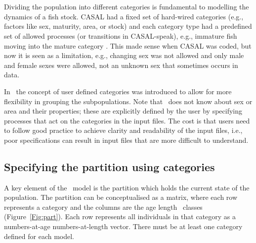 \section{\label{sec:PartitionCategories}}

Dividing the population into different categories is fundamental to modelling the dynamics of a fish stock. CASAL had a fixed set of hard-wired categories (e.g., factors like sex, maturity, area, or stock) and each category type had a predefined set of allowed processes (or transitions in CASAL-speak), e.g., immature fish moving into the mature category \citep{1388}. This made sense when CASAL was coded, but now it is seen as a limitation, e.g., changing sex was not allowed and only male and female sexes were allowed, not an unknown sex that sometimes occurs in data. 

In \CNAME\, the concept of user defined categories was introduced to allow for more flexibility in grouping the subpopulations. Note that \CNAME\ does not know about sex or area and their properties; these are explicitly defined by the user by specifying processes that act on the categories in the input files. The cost is that users need to follow good practice to achieve clarity and readability of the input files, i.e., poor specifications can result in input files that are more difficult to understand.

\subsection{Specifying the partition using categories}

A key element of the \CNAME\ model is the partition which holds the current state of the population. The partition can be conceptualised as a matrix, where each row represents a category and the columns are the \ifAgeBased age \else length \fi \ classes (Figure~\ref{Fig:part}). Each row represents all individuals in that category as a \ifAgeBased numbers-at-age \else numbers-at-length \fi vector.  There must be at least one category defined for each model.

